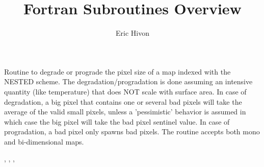 
\sloppy


\title{\healpix Fortran Subroutines Overview}
 \section[udgrade\_nest*]{ }
\label{sub:udgrade_nest}
\author{Eric Hivon}


\begin{facility}
{Routine to degrade or prograde the pixel size of a \healpix map indexed with
  the NESTED scheme. The degradation/progradation is done assuming an
intensive quantity (like temperature) that does NOT scale with surface area. \newline
In case of degradation, a big pixel that contains one or several bad pixels will
take the average of the valid small pixels, unless a 'pessimistic' behavior
is assumed in which case the big pixel will take the bad pixel sentinel value.
In case of progradation, a bad pixel only spawns bad pixels. \newline
The routine accepts both mono and bi-dimensional maps.
}
{\modUdgradeNr}
\end{facility}

\begin{f90format}
{%
, %
, %
, %
 }
\end{f90format}
\aboutoptional

